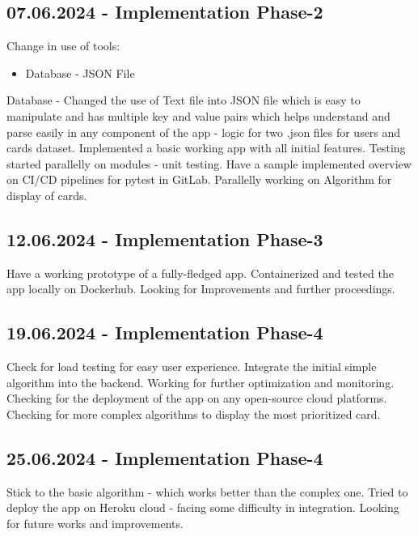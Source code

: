 \subsection*{07.06.2024 - Implementation Phase-2}
    Change in use of tools:\newline
    \begin{itemize}
        \item Database - JSON File
    \end{itemize}
    Database - Changed the use of Text file into JSON file which is easy to manipulate and has multiple key and value pairs which helps understand and parse easily in any component of the app - logic for two .json files for users and cards dataset.\newline
    Implemented a basic working app with all initial features.\newline
    Testing started parallelly on modules - unit testing.\newline
    Have a sample implemented overview on CI/CD pipelines for pytest in GitLab.\newline
    Parallelly working on Algorithm for display of cards.


\subsection*{12.06.2024 - Implementation Phase-3}
    Have a working prototype of a fully-fledged app.\newline
    Containerized and tested the app locally on Dockerhub.\newline
    Looking for Improvements and further proceedings.

\subsection*{19.06.2024 - Implementation Phase-4}
    Check for load testing for easy user experience.\newline
    Integrate the initial simple algorithm into the backend.\newline
    Working for further optimization and monitoring.\newline
    Checking for the deployment of the app on any open-source cloud platforms.\newline
    Checking for more complex algorithms to display the most prioritized card.


\subsection*{25.06.2024 - Implementation Phase-4}
    Stick to the basic algorithm - which works better than the complex one.\newline
    Tried to deploy the app on Heroku cloud - facing some difficulty in integration.\newline
    Looking for future works and improvements.



